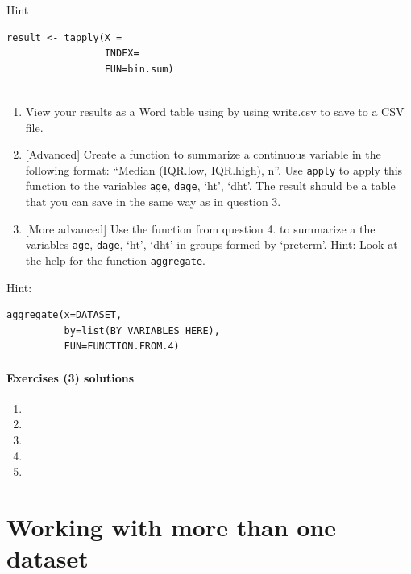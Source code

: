 \documentclass[
]{book}
\providecommand{\tightlist}{%
  \setlength{\itemsep}{0pt}\setlength{\parskip}{0pt}}
\begin{document}
Hint

\begin{verbatim}
result <- tapply(X = 
                 INDEX= 
                 FUN=bin.sum)
        
\end{verbatim}

\begin{enumerate}
\def\labelenumi{\arabic{enumi}.}
\setcounter{enumi}{2}
\item
  View your results as a Word table using by using write.csv to save to a CSV file.
\item
  {[}Advanced{]} Create a function to summarize a continuous variable in the following format: ``Median (IQR.low, IQR.high), n''. Use \texttt{apply} to apply this function to the variables \texttt{age}, \texttt{dage}, `ht', `dht'. The result should be a table that you can save in the same way as in question 3.
\item
  {[}More advanced{]} Use the function from question 4. to summarize a the variables \texttt{age}, \texttt{dage}, `ht', `dht' in groups formed by `preterm'. Hint: Look at the help for the function \texttt{aggregate}.
\end{enumerate}

Hint:

\begin{verbatim}
aggregate(x=DATASET, 
          by=list(BY VARIABLES HERE), 
          FUN=FUNCTION.FROM.4)
\end{verbatim}

\hypertarget{exercises-3-solutions}{%
\paragraph*{Exercises (3) solutions}\label{exercises-3-solutions}}

\begin{enumerate}
\def\labelenumi{\arabic{enumi}.}
\tightlist
\item
\item
\item
\item
\item
\end{enumerate}

\newpage

\hypertarget{working-with-more-than-one-dataset}{%
\section*{Working with more than one dataset}\label{working-with-more-than-one-dataset}}
\end{document}
